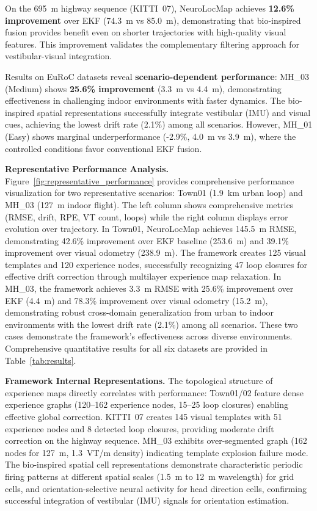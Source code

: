 On the 695~m highway sequence (KITTI~07), NeuroLocMap achieves \textbf{12.6\% improvement} over EKF (74.3~m vs 85.0~m), demonstrating that bio-inspired fusion provides benefit even on shorter trajectories with high-quality visual features. This improvement validates the complementary filtering approach for ves\-tib\-u\-lar-visual integration.

Results on EuRoC datasets reveal \textbf{scenario-dependent per\-for\-mance}: MH\_03 (Medium) shows \textbf{25.6\% improvement} (3.3~m vs 4.4~m), demonstrating effectiveness in challenging indoor environments with faster dynamics. The bio-inspired spatial representations successfully integrate ves\-tib\-u\-lar (IMU) and visual cues, achieving the lowest drift rate (2.1\%) among all scenarios. However, MH\_01 (Easy) shows marginal underperformance (-2.9\%, 4.0~m vs 3.9~m), where the controlled conditions favor conventional EKF fusion.

\textbf{Representative Performance Analysis.} Figure~\ref{fig:representative_performance} provides comprehensive per\-for\-mance visualization for two representative scenarios: Town01 (1.9~km urban loop) and MH\_03 (127~m indoor flight). The left column shows comprehensive metrics (RMSE, drift, RPE, VT count, loops) while the right column displays error evolution over trajectory. In Town01, NeuroLocMap achieves 145.5~m RMSE, demonstrating 42.6\% improvement over EKF baseline (253.6~m) and 39.1\% improvement over visual odometry (238.9~m). The framework creates 125 visual templates and 120 experience nodes, successfully recognizing 47 loop closures for effective drift correction through multilayer experience map relaxation. In MH\_03, the framework achieves 3.3~m RMSE with 25.6\% improvement over EKF (4.4~m) and 78.3\% improvement over visual odometry (15.2~m), demonstrating robust cross-domain generalization from urban to indoor environments with the lowest drift rate (2.1\%) among all scenarios. These two cases demonstrate the framework's effectiveness across diverse environments. Comprehensive quantitative results for all six datasets are provided in Table~\ref{tab:results}.

\textbf{Framework Internal Representations.} The topological structure of experience maps directly correlates with per\-for\-mance: Town01/02 feature dense experience graphs (120--162 experience nodes, 15--25 loop closures) enabling effective global correction. KITTI~07 creates 145 visual templates with 51 experience nodes and 8 detected loop closures, providing moderate drift correction on the highway sequence. MH\_03 exhibits over-segmented graph (162 nodes for 127~m, 1.3~VT/m density) indicating template explosion failure mode. The bio-inspired spatial cell representations demonstrate characteristic periodic firing patterns at different spatial scales (1.5~m to 12~m wavelength) for grid cells, and orientation-selective neural activity for head direction cells, confirming successful integration of ves\-tib\-u\-lar (IMU) signals for orientation estimation.

